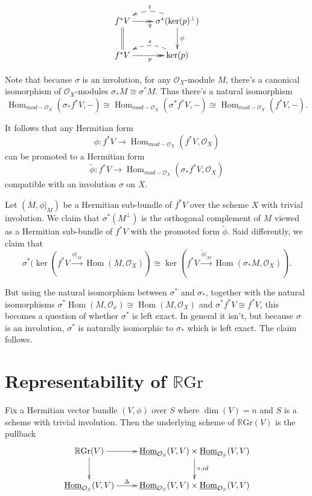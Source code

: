 \documentclass[edeposit,fullpage]{uiucthesis2009}
\newcommand{\mc}{\mathcal}
\newcommand{\RGr}{\mathbb R\mathrm{Gr}}
\DeclareMathOperator{\Hom}{Hom}
\theoremstyle{plain}
\numberwithin{lemma}{section}
\theoremstyle{definition}
\begin{document}
\[
\xymatrix{f^*V \ar@{>>}[r]_q \ar@{=}[d]& \ar@/_1.0pc/@{-->}[l]_t\sigma^*(\ker(p)^\perp) \ar[d]^\psi\\
f^*V \ar@{>>}[r]_{p} & \ar@/_1.0pc/@{-->}[l]_{s}\ker(p)}
\]

Note that because $\sigma$ is an involution, for any $\mc O_X$-module
$M$, there's a canonical isomorphism of $\mc O_X$-modules $\sigma_*M \cong
\sigma^*M$. Thus there's a natural isomorphism 
\[
\Hom_{mod-\mc
  O_X}(\sigma_*f^*V,-) \cong \Hom_{mod-\mc O_X}(\sigma^*f^*V,-) \cong
\Hom_{mod-\mc O_X}(f^*V,-).
\]

It follows that any Hermitian form
\[
\phi : f^*V \rightarrow \Hom_{mod-\mc O_X}(f^*V,\mc O_X)
\]
can be promoted to a Hermitian form
\[
\widetilde\phi : f^*V \rightarrow \Hom_{mod-\mc O_X}(\sigma_*f^*V,\mc O_X)
\]
compatible with an involution $\sigma$ on $X$.

Let $(M,\phi|_M)$ be a Hermitian sub-bundle of $f^*V$ over the scheme $X$ with
trivial involution. We claim that $\sigma^*(M^\perp)$ is the
orthogonal complement of $M$ viewed as a Hermitian sub-bundle of
$f^*V$ with the promoted form $\widetilde \phi$. Said differently, we
claim that
\[
\sigma^*(\ker(f^*V \xrightarrow{\phi|_M} \Hom(M,\mc O_X)) \cong \ker(f^*V
\xrightarrow{\widetilde \phi|_M} \Hom(\sigma_*M,\mc O_X)).
\]

But using the natural isomorphism between $\sigma^*$ and $\sigma_*$,
together with the natural isomorphisms $\sigma^*\Hom(M,\mc O_x) \cong
\Hom(M,\mc O_X)$ and $\sigma^*f^*V \cong f^*V$, this becomes a question
of whether $\sigma^*$ is left exact. In general it isn't, but because
$\sigma$ is an involution, $\sigma^*$ is naturally isomorphic to
$\sigma_*$ which is left exact. The claim follows.



\section{Representability of $\RGr$}\label{subsec:representability}


Fix a Hermitian vector bundle $(V,\phi)$ over $S$ where $\dim(V) = n$
and $S$ is a scheme with
trivial involution. Then the underlying scheme of $\RGr(V)$ is the
pullback 
\[
\xymatrix{\RGr(V) \ar[r]\ar[d] & \uline{\Hom}_{\mc O_S}(V,V) \times
  \uline{\Hom}_{\mc O_S}(V,V) \ar[d]^{\circ, id} \\ \uline{\Hom}_{\mc
    O_S}(V,V) \ar[r]^-\Delta & \uline{\Hom}_{\mc O_S}(V,V) \times \uline{\Hom}_{\mc O_S}(V,V)}
\]
\end{document}
